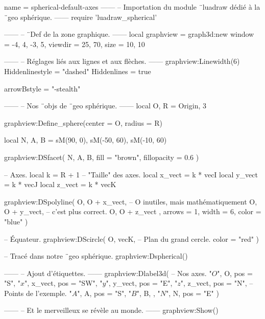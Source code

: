\documentclass{standalone}
\begin{document}
\begin{luadraw}{name = spherical-default-axes}
------
-- Importation du module ¨luadraw dédié à la ¨geo sphérique.
------
require 'luadraw_spherical'

------
-- ¨Def de la zone graphique.
------
local graphview = graph3d:new{
  window  = {-4, 4, -3, 5},
  viewdir = {25, 70},
  size    = {10, 10}
}

------
-- Réglages liés aux lignes et aux flèches.
------
graphview:Linewidth(6)
Hiddenlinestyle = "dashed"
Hiddenlines     = true

arrowBstyle = "-stealth"

------
-- Nos ¨objs de ¨geo sphérique.
------
local O, R = Origin, 3

graphview:Define_sphere({center = O, radius = R})

local N, A, B = sM(90, 0), sM(-50, 60), sM(-10, 60)

graphview:DSfacet(
  {N, A, B},
  {fill = "brown", fillopacity = 0.6}
)

-- Axes.
local k      = R + 1     -- "Taille" des axes.
local x_vect = k * vecI
local y_vect = k * vecJ
local z_vect = k * vecK

graphview:DSpolyline(
  {
    {O, O + x_vect},  -- O inutiles, mais mathématiquement
    {O, O + y_vect},  -- c'est plus correct.
    {O, O + z_vect}
  },
  {arrows = 1, width = 6, color = "blue"}
)

-- Équateur.
graphview:DScircle(
  {O, vecK},       -- Plan du grand cercle.
  {color = "red"}
)

-- Tracé dans notre ¨geo sphérique.
graphview:Dspherical()

------
-- Ajout d'étiquettes.
------
graphview:Dlabel3d(
-- Nos axes.
  "$O$", O, {pos = "S"},
  "$x$", x_vect, {pos = "SW"},
  "$y$", y_vect, {pos = "E"},
  "$z$", z_vect, {pos = "N"},
-- Points de l'exemple.
  "$A$", A, {pos = "S"},
  "$B$", B, {},
  "$N$", N, {pos = "E"}
)

------
-- Et le merveilleux se révèle au monde.
------
graphview:Show()
\end{luadraw}
\end{document}

